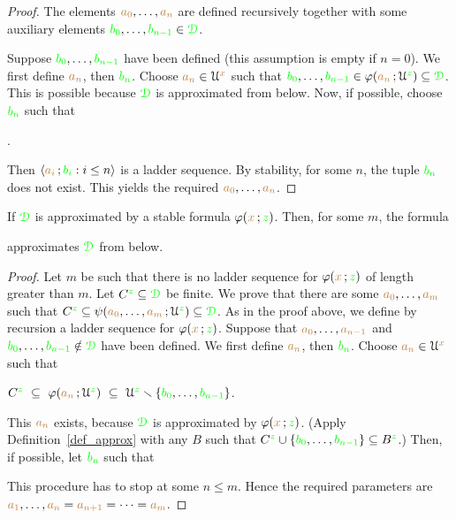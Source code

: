 \begin{proof}
The elements ${\color{brown} a_0},\dots,{\color{brown} a_n}$ are defined recursively together with some auxiliary elements ${\color{green} b_0},\dots,{\color{green} b_{n-1}}\in{\color{green}\EuScript D}$.

Suppose ${\color{green} b_0},\dots,{\color{green} b_{n-1}}$ have been defined (this assumption is empty if $n=0$).
We first define ${\color{brown} a_n}$, then ${\color{green} b_n}$.
Choose ${\color{brown} a_n}\in\EuScript U^{\color{brown} x}$ such that ${\color{green} b_0},\dots,{\color{green} b_{n-1}}\in\varphi({\color{brown} a_n}\,;\EuScript U^{\color{green} z})\subseteq{\color{green}\EuScript D}$.
This is possible because ${\color{green}\EuScript D}$ is approximated from below.
Now, if possible, choose ${\color{green} b_n}$ such that

.

Then $\langle{\color{brown}a_i}\,;{\color{green} b_i} : i\le n\rangle$ is a ladder sequence.
By stability, for some $n$, the tuple ${\color{green} b_n}$ does not exist.
This yields the required ${\color{brown} a_0},\dots,{\color{brown} a_n}$.
\end{proof}

\begin{lemma}\label{lem_stab_approx_below}
If ${\color{green}\EuScript D}$ is approximated by a stable formula $\varphi({\color{brown} x}\,;{\color{green} z})$.
Then, for some $m$, the formula


approximates ${\color{green}\EuScript D}$ from below.
\end{lemma}

\begin{proof}
Let $m$ be such that there is no ladder sequence for $\varphi({\color{brown} x}\,;{\color{green} z})$ of length greater than $m$.
Let $C^{\color{green} z}\subseteq{\color{green}\EuScript D}$ be finite.
We prove that there are some ${\color{brown} a_0},\dots,{\color{brown} a_m}$ such that $C^{\color{green} z}\subseteq\psi({\color{brown} a_0},\dots,{\color{brown} a_m}\,;\EuScript U^{\color{green} z})\subseteq{\color{green}\EuScript D}$.
As in the proof above, we define by recursion a ladder sequence for $\varphi({\color{brown} x}\,;{\color{green} z})$.
Suppose that ${\color{brown} a_0},\dots,{\color{brown} a_{n-1}}$ and ${\color{green} b_0},\dots,{\color{green} b_{n-1}}\notin{\color{green}\EuScript D}$ have been defined.
We first define ${\color{brown} a_n}$, then ${\color{green} b_n}$. 
Choose ${\color{brown} a_n}\in\EuScript U^{\color{brown} x}$ such that 

\hfil$C^{\color{green} z}\ \subseteq\ \varphi({\color{brown} a_n}\,;\EuScript U^{\color{green} z})\ \subseteq\ \EuScript U^{\color{green} z}\smallsetminus\{{\color{green} b_0},\dots,{\color{green} b_{n-1}}\}$.

This ${\color{brown} a_n}$ exists, because ${\color{green}\EuScript D}$ is approximated by $\varphi({\color{brown} x}\,;{\color{green} z})$.
(Apply Definition~\ref{def_approx} with any $B$ such that $C^{\color{green} z}\cup\{{\color{green} b_0},\dots,{\color{green} b_{n-1}}\}\subseteq B^{\color{green} z}$.)
Then, if possible, let ${\color{green} b_n}$ such that


This procedure has to stop at some $n\le m$.
Hence the required parameters are ${\color{brown} a_1},\dots,{\color{brown} a_n}={\color{brown} a_{n+1}}=\dots={\color{brown} a_{m}}$.
\end{proof}


